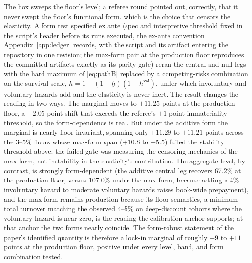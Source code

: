 \documentclass[12pt]{article}
\begin{document}
The box sweeps the floor's level; a referee round pointed out, correctly, that it never swept the floor's functional form, which is the choice that censors the elasticity. A form test specified ex ante (spec and interpretive threshold fixed in the script's header before its runs executed, the ex-ante convention Appendix~\ref{app:ledger} records, with the script and its artifact entering the repository in one revision; the max-form pair at the production floor reproduces the committed artifacts exactly as its parity gate) reran the central and null legs with the hard maximum of \eqref{eq:pathB} replaced by a competing-risks combination on the survival scale, $h = 1 - (1 - \underline{h})(1 - h^{\mathrm{vol}})$, under which involuntary and voluntary hazards add and the elasticity is never inert. The result changes the reading in two ways. The marginal moves to $+11.25$ points at the production floor, a $+2.05$-point shift that exceeds the referee's $\pm 1$-point immateriality threshold, so the form-dependence is real. But under the additive form the marginal is nearly floor-invariant, spanning only $+11.29$ to $+11.21$ points across the 3--5\% floors whose max-form span ($+10.8$ to $+5.5$) failed the stability threshold above: the failed gate was measuring the censoring mechanics of the max form, not instability in the elasticity's contribution. The aggregate level, by contrast, is strongly form-dependent (the additive central leg recovers 67.2\% at the production floor, versus 107.0\% under the max form, because adding a 4\% involuntary hazard to moderate voluntary hazards raises book-wide prepayment), and the max form remains production because its floor semantics, a minimum total turnover matching the observed 4--5\% on deep-discount cohorts where the voluntary hazard is near zero, is the reading the calibration anchor supports; at that anchor the two forms nearly coincide. The form-robust statement of the paper's identified quantity is therefore a lock-in marginal of roughly $+9$ to $+11$ points at the production floor, positive under every level, band, and form combination tested.
\end{document}
